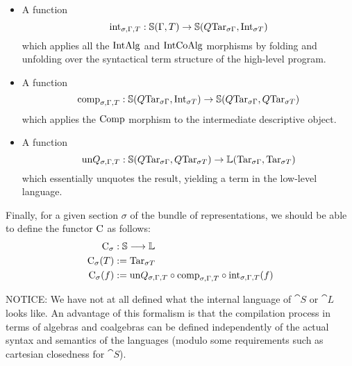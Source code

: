\begin{itemize}
  \item A function $$\mathrm {int} _{\sigma, \Gamma, T} : \mathbb S (\Gamma, T) \to \mathbb S (Q
          \mathrm {Tar}_{\sigma \Gamma}, \mathrm {Int} _{\sigma T})$$ which applies all the
        $\mathrm {IntAlg}$ and $\mathrm {IntCoAlg}$ morphisms by folding and unfolding over
        the syntactical term structure of the high-level program.
  \item A function $$\mathrm {comp} _{\sigma, \Gamma, T} : \mathbb S (Q \mathrm {Tar}_{\sigma
            \Gamma}, \mathrm {Int} _{\sigma T}) \to \mathbb S (Q \mathrm {Tar}_{\sigma \Gamma}, Q
          \mathrm {Tar}_{\sigma T})$$ which applies the $\mathrm {Comp}$ morphism to the
        intermediate descriptive object.
  \item A function $$\mathrm {un}Q _{\sigma, \Gamma, T} : \mathbb S (Q \mathrm {Tar}_{\sigma
            \Gamma}, Q \mathrm {Tar}_{\sigma T}) \to \mathbb L (\mathrm {Tar}_{\sigma \Gamma}, \mathrm
          {Tar} _{\sigma T})$$ which essentially unquotes the result, yielding a term in
        the low-level language.
\end{itemize}

Finally, for a given section $\sigma$ of the bundle of representations, we
should be able to define the functor $\mathrm C$ as follows:
\begin{align*}
  \mathrm C_\sigma     & : \mathbb S \longrightarrow \mathbb L                                                                                           \\
  \mathrm C_\sigma (T) & := \mathrm {Tar} _{\sigma T}                                                                                           \\
  \mathrm C_\sigma (f) & := \mathrm {un}Q _{\sigma, \Gamma, T} \circ \mathrm {comp} _{\sigma, \Gamma, T} \circ \mathrm {int} _{\sigma, \Gamma, T} (f)
\end{align*}

NOTICE: We have not at all defined what the internal language of $\cat S$ or
$\cat L$ looks like. An advantage of this formalism is that the compilation
process in terms of algebras and coalgebras can be defined independently of the
actual syntax and semantics of the languages (modulo some requirements such as
cartesian closedness for $\cat S$).


